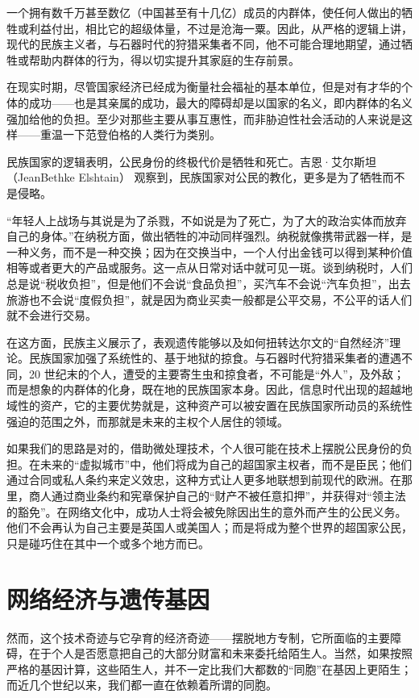 一个拥有数千万甚至数亿（中国甚至有十几亿）成员的内群体，使任何人做出的牺牲或利益付出，相比它的超级体量，不过是沧海一粟。因此，从严格的逻辑上讲，现代的民族主义者，与石器时代的狩猎采集者不同，他不可能合理地期望，通过牺牲或帮助内群体的行为，得以切实提升其家庭的生存前景。

在现实时期，尽管国家经济已经成为衡量社会福祉的基本单位，但是对有才华的个体的成功——也是其亲属的成功，最大的障碍却是以国家的名义，即内群体的名义强加给他的负担。至少对那些主要从事互惠性，而非胁迫性社会活动的人来说是这样——重温一下范登伯格的人类行为类别。

民族国家的逻辑表明，公民身份的终极代价是牺牲和死亡。吉恩·艾尔斯坦（JeanBethke Elshtain） 观察到，民族国家对公民的教化，更多是为了牺牲而不是侵略。

“年轻人上战场与其说是为了杀戮，不如说是为了死亡，为了大的政治实体而放弃自己的身体。”在纳税方面，做出牺牲的冲动同样强烈。纳税就像携带武器一样，是一种义务，而不是一种交换；因为在交换当中，一个人付出金钱可以得到某种价值相等或者更大的产品或服务。这一点从日常对话中就可见一斑。谈到纳税时，人们总是说“税收负担”，但是他们不会说“食品负担”，买汽车不会说“汽车负担”，出去旅游也不会说“度假负担”，就是因为商业买卖一般都是公平交易，不公平的话人们就不会进行交易。

在这方面，民族主义展示了，表观遗传能够以及如何扭转达尔文的“自然经济”理论。民族国家加强了系统性的、基于地狱的掠食。与石器时代狩猎采集者的遭遇不同，20 世纪末的个人，遭受的主要寄生虫和掠食者，不可能是“外人”，及外敌；而是想象的内群体的化身，既在地的民族国家本身。因此，信息时代出现的超越地域性的资产，它的主要优势就是，这种资产可以被安置在民族国家所动员的系统性强迫的范围之外，而那就是未来的主权个人居住的领域。

如果我们的思路是对的，借助微处理技术，个人很可能在技术上摆脱公民身份的负担。在未来的“虚拟城市”中，他们将成为自己的超国家主权者，而不是臣民；他们通过合同或私人条约来定义效忠，这种方式让人更多地联想到前现代的欧洲。在那里，商人通过商业条约和宪章保护自己的“财产不被任意扣押”，并获得对“领主法的豁免”。在网络文化中，成功人士将会被免除因出生的意外而产生的公民义务。他们不会再认为自己主要是英国人或美国人；而是将成为整个世界的超国家公民，只是碰巧住在其中一个或多个地方而已。

\section{网络经济与遗传基因}
然而，这个技术奇迹与它孕育的经济奇迹——摆脱地方专制，它所面临的主要障碍，在于个人是否愿意把自己的大部分财富和未来委托给陌生人。当然，如果按照严格的基因计算，这些陌生人，并不一定比我们大都数的“同胞”在基因上更陌生；而近几个世纪以来，我们都一直在依赖着所谓的同胞。

